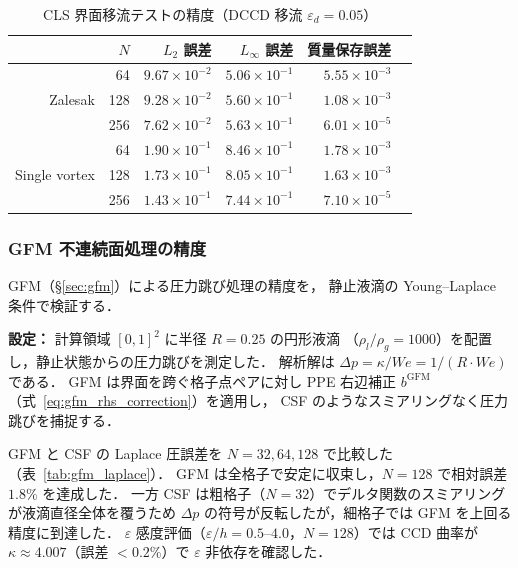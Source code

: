 \begin{table}[htbp]
\centering
\caption{CLS 界面移流テストの精度（DCCD 移流 $\varepsilon_d = 0.05$）}
\label{tab:cls_advection}
\begin{tabular}{rrrrrr}
\toprule
 & $N$ & $L_2$ 誤差 & $L_\infty$ 誤差 & 質量保存誤差 \\
\midrule
\multirow{3}{*}{Zalesak}
 &  64 & $9.67 \times 10^{-2}$ & $5.06 \times 10^{-1}$ & $5.55 \times 10^{-3}$ \\
 & 128 & $9.28 \times 10^{-2}$ & $5.60 \times 10^{-1}$ & $1.08 \times 10^{-3}$ \\
 & 256 & $7.62 \times 10^{-2}$ & $5.63 \times 10^{-1}$ & $6.01 \times 10^{-5}$ \\
\midrule
\multirow{3}{*}{Single vortex}
 &  64 & $1.90 \times 10^{-1}$ & $8.46 \times 10^{-1}$ & $1.78 \times 10^{-3}$ \\
 & 128 & $1.73 \times 10^{-1}$ & $8.05 \times 10^{-1}$ & $1.63 \times 10^{-3}$ \\
 & 256 & $1.43 \times 10^{-1}$ & $7.44 \times 10^{-1}$ & $7.10 \times 10^{-5}$ \\
\bottomrule
\end{tabular}
\end{table}

\subsubsection{GFM 不連続面処理の精度}
\label{sec:verify_gfm}

GFM（§\ref{sec:gfm}）による圧力跳び処理の精度を，
静止液滴の Young--Laplace 条件で検証する．

\textbf{設定：} 計算領域 $[0,1]^2$ に半径 $R = 0.25$ の円形液滴
（$\rho_l/\rho_g = 1000$）を配置し，静止状態からの圧力跳びを測定した．
解析解は $\Delta p = \kappa/\mathit{We} = 1/(R \cdot \mathit{We})$ である．
GFM は界面を跨ぐ格子点ペアに対し PPE 右辺補正
$b^{\mathrm{GFM}}$（式~\eqref{eq:gfm_rhs_correction}）を適用し，
CSF のようなスミアリングなく圧力跳びを捕捉する．

GFM と CSF の Laplace 圧誤差を $N = 32, 64, 128$ で比較した（表~\ref{tab:gfm_laplace}）．
GFM は全格子で安定に収束し，$N = 128$ で相対誤差 $1.8\%$ を達成した．
一方 CSF は粗格子（$N = 32$）でデルタ関数のスミアリングが液滴直径全体を覆うため
$\Delta p$ の符号が反転したが，細格子では GFM を上回る精度に到達した．
$\varepsilon$ 感度評価（$\varepsilon/h = 0.5$--$4.0$，$N = 128$）では
CCD 曲率が $\kappa \approx 4.007$（誤差 $< 0.2\%$）で $\varepsilon$ 非依存を確認した．

